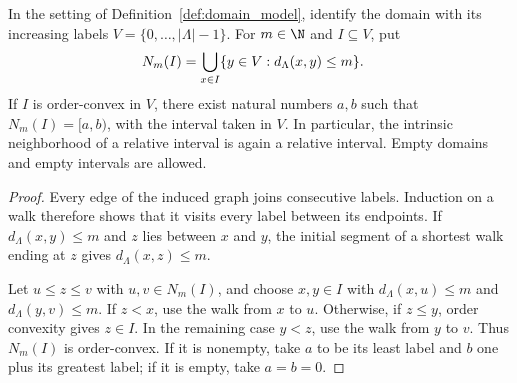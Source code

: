 \begin{lemma}
    \label{thm:domain_interval_neighborhood}
    \leanok
    In the setting of Definition~\ref{def:domain_model}, identify the domain
    with its increasing labels $V=\{0,\ldots,|\Lambda|-1\}$.
    For $m\in\N$ and $I\subseteq V$, put
    \begin{align}
        N_m(I) & =\bigcup_{x\in I}\{y\in V:d_\Lambda(x,y)\le m\}.\notag
    \end{align}
    If $I$ is order-convex in $V$, there exist natural numbers $a,b$ such that
    $N_m(I)=[a,b)$, with the interval taken in $V$.
    In particular, the intrinsic neighborhood of a relative interval is
    again a relative interval. Empty domains and empty intervals are allowed.
\end{lemma}
\begin{proof}\leanok
    Every edge of the induced graph joins consecutive labels. Induction on
    a walk therefore shows that it visits every label between its endpoints.
    If $d_\Lambda(x,y)\le m$ and $z$ lies between $x$ and $y$, the initial
    segment of a shortest walk ending at $z$ gives $d_\Lambda(x,z)\le m$.

    Let $u\le z\le v$ with $u,v\in N_m(I)$, and choose $x,y\in I$ with
    $d_\Lambda(x,u)\le m$ and $d_\Lambda(y,v)\le m$.
    If $z<x$, use the walk from $x$ to $u$.
    Otherwise, if $z\le y$, order convexity gives $z\in I$.
    In the remaining case $y<z$, use the walk from $y$ to $v$.
    Thus $N_m(I)$ is order-convex. If it is nonempty, take $a$ to be its
    least label and $b$ one plus its greatest label; if it is empty, take
    $a=b=0$.
\end{proof}

